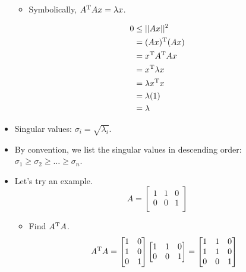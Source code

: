 \documentclass{article}
\begin{document}
\begin{itemize}
    \begin{itemize}
        \item Symbolically, $A^{\text{T}} Ax=\lambda x$.
    \end{itemize}
    \begin{align*}
        0 &\leq ||Ax||^2\\
        &= (Ax)^{\text{T}}(Ax)\\
        &= x^{\text{T}} A^{\text{T}} Ax\\
        &= x^{\text{T}}\lambda x\\
        &= \lambda x^{\text{T}} x\\
        &= \lambda(1)\\
        &= \lambda
    \end{align*}
    \item Singular values: $\sigma_i=\sqrt{\lambda_i}$.
    \item By convention, we list the singular values in descending order: $\sigma_1\geq\sigma_2\geq\dots\geq\sigma_n$.
    \item Let's try an example.
    \begin{equation*}
        A=
        \begin{bmatrix}
            1 & 1 & 0\\
            0 & 0 & 1\\
        \end{bmatrix}
    \end{equation*}
    \begin{itemize}
        \item Find $A^{\text{T}} A$.
        \begin{equation*}
            A^\T A =
            \begin{bmatrix}
                1 & 0\\
                1 & 0\\
                0 & 1\\
            \end{bmatrix}
            \begin{bmatrix}
                1 & 1 & 0\\
                0 & 0 & 1\\
            \end{bmatrix}
            =
            \begin{bmatrix}
                1 & 1 & 0\\
                1 & 1 & 0\\
                0 & 0 & 1\\
            \end{bmatrix}

\end{equation*}
\end{itemize}
\end{itemize}
\end{document}
